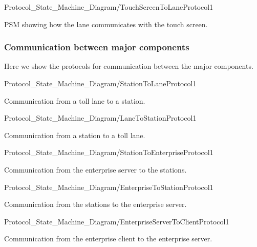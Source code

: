 \begin{myfigure}{Protocol_State_Machine_Diagram/TouchScreenToLaneProtocol}{1}
\caption{PSM showing how the lane communicates with the touch screen. \madeby{\mb}{\mt}}
\label{fig:TSL}
\end{myfigure}

\subsubsection{Communication between major components}
Here we show the protocols for communication between the major components.
\begin{myfigure}{Protocol_State_Machine_Diagram/StationToLaneProtocol}{1}
\caption{Communication from a toll lane to a station. \madeby{\mt}{\af}}
\end{myfigure}

\begin{myfigure}{Protocol_State_Machine_Diagram/LaneToStationProtocol}{1}
\caption{Communication from a station to a toll lane. \madeby{\kj}{\jb}}
\end{myfigure}

\begin{myfigure}{Protocol_State_Machine_Diagram/StationToEnterpriseProtocol}{1}
\caption{Communication from the enterprise server to the stations. \madeby{\mb}{\mt}}
\end{myfigure}

\begin{myfigure}{Protocol_State_Machine_Diagram/EnterpriseToStationProtocol}{1}
\caption{Communication from the stations to the enterprise server. \madeby{\af}{\kj}}
\end{myfigure}

\begin{myfigure}{Protocol_State_Machine_Diagram/EnterpriseServerToClientProtocol}{1}
\caption{Communication from the enterprise client to the enterprise server. \madeby{\jb}{\mb}}
\end{myfigure}
